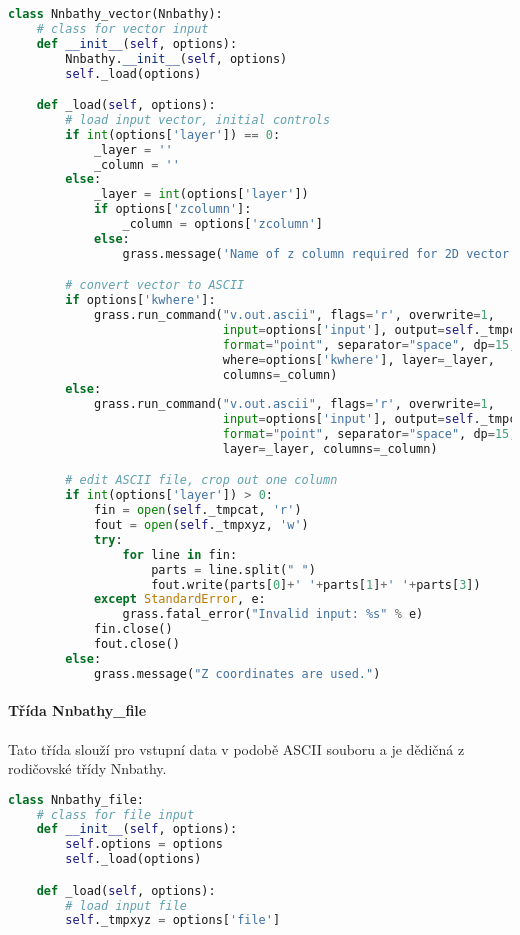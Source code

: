 \documentclass[12pt,a4paper]{article}
\begin{document}
\begin{lstlisting}[language=python,caption={python version}]
class Nnbathy_vector(Nnbathy):
    # class for vector input
    def __init__(self, options):
        Nnbathy.__init__(self, options)
        self._load(options)

    def _load(self, options):
        # load input vector, initial controls
        if int(options['layer']) == 0:
            _layer = ''
            _column = ''
        else:
            _layer = int(options['layer'])
            if options['zcolumn']:
                _column = options['zcolumn']
            else:
                grass.message('Name of z column required for 2D vector maps.')

        # convert vector to ASCII
        if options['kwhere']:
            grass.run_command("v.out.ascii", flags='r', overwrite=1,
                              input=options['input'], output=self._tmpcat,
                              format="point", separator="space", dp=15,
                              where=options['kwhere'], layer=_layer,
                              columns=_column)
        else:
            grass.run_command("v.out.ascii", flags='r', overwrite=1,
                              input=options['input'], output=self._tmpcat,
                              format="point", separator="space", dp=15,
                              layer=_layer, columns=_column)

        # edit ASCII file, crop out one column
        if int(options['layer']) > 0:
            fin = open(self._tmpcat, 'r')
            fout = open(self._tmpxyz, 'w')
            try:
                for line in fin:
                    parts = line.split(" ")
                    fout.write(parts[0]+' '+parts[1]+' '+parts[3])
            except StandardError, e:
                grass.fatal_error("Invalid input: %s" % e)
            fin.close()
            fout.close()
        else:
            grass.message("Z coordinates are used.")
\end{lstlisting}

\paragraph{Třída Nnbathy\_file}
Tato třída slouží pro vstupní data v podobě ASCII souboru a je dědičná z rodičovské třídy Nnbathy.

\begin{lstlisting}[language=python, caption={python version}]
class Nnbathy_file:
    # class for file input
    def __init__(self, options):
        self.options = options
        self._load(options)

    def _load(self, options):
        # load input file
        self._tmpxyz = options['file']
\end{lstlisting}
\end{document}
